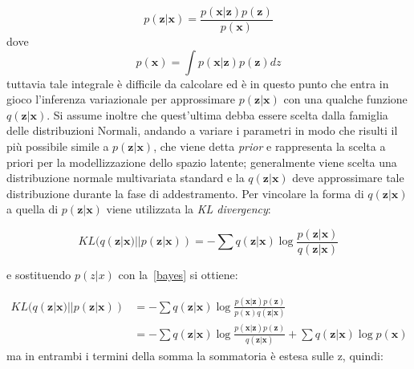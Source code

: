 \begin{equation}
	p(\textbf{z}|\textbf{x}) = \frac{p(\textbf{x}|\textbf{z}) p(\textbf{z})}{p(\textbf{x})}
	\label{bayes}
\end{equation}
dove
\begin{equation}
	p(\textbf{x}) = \int p(\textbf{x}|\textbf{z}) p(\textbf{z}) dz
	\label{integrale}
\end{equation}
tuttavia tale integrale è difficile da calcolare ed è in questo punto che entra in gioco l'inferenza variazionale per approssimare $p(\textbf{z}|\textbf{x})$ con una qualche funzione $q(\textbf{z}|\textbf{x})$. Si assume inoltre che quest'ultima debba essere scelta dalla famiglia delle distribuzioni Normali, andando a variare i parametri in modo che risulti il più possibile simile a $p(\textbf{z}|\textbf{x})$, che viene detta \textit{prior} e rappresenta la scelta a priori per la modellizzazione dello spazio latente; generalmente viene scelta una distribuzione normale multivariata standard e la $q(\textbf{z}|\textbf{x})$ deve approssimare tale distribuzione durante la fase di addestramento. Per vincolare la forma di $q(\textbf{z}|\textbf{x})$ a quella di $p(\textbf{z}|\textbf{x})$ viene utilizzata la \textit{KL divergency}: 


\begin{equation}
	KL (q(\textbf{z}|\textbf{x}) || p(\textbf{z}|\textbf{x})) = -\sum q(\textbf{z}|\textbf{x}) \log \frac{p(\textbf{z}|\textbf{x})}{q(\textbf{z}|\textbf{x})}
\end{equation}

e sostituendo $p(z|x)$ con la~\ref{bayes} si ottiene:


\begin{align*} 
	KL (q(\textbf{z}|\textbf{x}) || p(\textbf{z}|\textbf{x})) &=  -\sum q(\textbf{z}|\textbf{x}) \log \frac{p(\textbf{x}|\textbf{z})p(\textbf{z})}{p(\textbf{x})q(\textbf{z}|\textbf{x})} \\ &=  -\sum q(\textbf{z}|\textbf{x})\log \frac{p(\textbf{x}|\textbf{z})p(\textbf{z})}{q(\textbf{z}|\textbf{x})} + \sum q(\textbf{z}|\textbf{x})\log p(\textbf{x})
\end{align*}
ma in entrambi i termini della somma la sommatoria è estesa sulle z, quindi:

